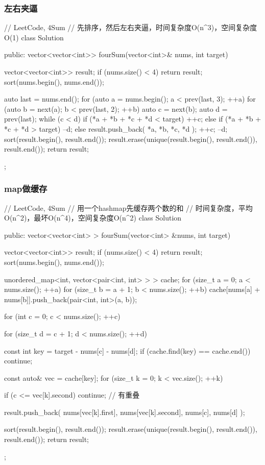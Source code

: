 \subsubsection{左右夹逼}
\begin{Code}
// LeetCode, 4Sum
// 先排序，然后左右夹逼，时间复杂度O(n^3)，空间复杂度O(1)
class Solution {
public:
    vector<vector<int>> fourSum(vector<int>& nums, int target) {
        vector<vector<int>> result;
        if (nums.size() < 4) return result;
        sort(nums.begin(), nums.end());

        auto last = nums.end();
        for (auto a = nums.begin(); a < prev(last, 3); ++a) {
            for (auto b = next(a); b < prev(last, 2); ++b) {
                auto c = next(b);
                auto d = prev(last);
                while (c < d) {
                    if (*a + *b + *c + *d < target) {
                        ++c;
                    } else if (*a + *b + *c + *d > target) {
                        --d;
                    } else {
                        result.push_back({ *a, *b, *c, *d });
                        ++c;
                        --d;
                    }
                }
            }
        }
        sort(result.begin(), result.end());
        result.erase(unique(result.begin(), result.end()), result.end());
        return result;
    }
};
\end{Code}


\subsubsection{map做缓存}
\begin{Code}
// LeetCode, 4Sum
// 用一个hashmap先缓存两个数的和
// 时间复杂度，平均O(n^2)，最坏O(n^4)，空间复杂度O(n^2)
class Solution {
public:
    vector<vector<int> > fourSum(vector<int> &nums, int target) {
        vector<vector<int>> result;
        if (nums.size() < 4) return result;
        sort(nums.begin(), nums.end());

        unordered_map<int, vector<pair<int, int> > > cache;
        for (size_t a = 0; a < nums.size(); ++a) {
            for (size_t b = a + 1; b < nums.size(); ++b) {
                cache[nums[a] + nums[b]].push_back(pair<int, int>(a, b));
            }
        }

        for (int c = 0; c < nums.size(); ++c) {
            for (size_t d = c + 1; d < nums.size(); ++d) {
                const int key = target - nums[c] - nums[d];
                if (cache.find(key) == cache.end()) continue;

                const auto& vec = cache[key];
                for (size_t k = 0; k < vec.size(); ++k) {
                    if (c <= vec[k].second)
                        continue; // 有重叠

                    result.push_back( { nums[vec[k].first],
                            nums[vec[k].second], nums[c], nums[d] });
                }
            }
        }
        sort(result.begin(), result.end());
        result.erase(unique(result.begin(), result.end()), result.end());
        return result;
    }
};
\end{Code}


